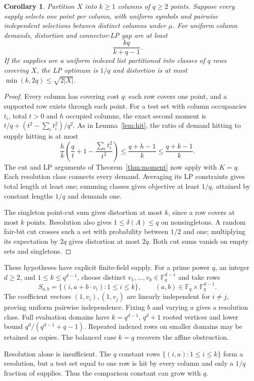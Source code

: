 \documentclass[11pt]{article}
\newtheorem{corollary}[theorem]{Corollary}
\newcommand{\F}{\mathbb F}
\begin{document}
\begin{corollary}\label{cor:transversal}
Partition $X$ into $k\ge1$ columns of $q\ge2$ points. Suppose every supply
selects one point per column, with uniform symbols and pairwise independent
selections between distinct columns under $\mu$. For uniform column demands,
distortion and connector-LP gap are at least
\[
 \frac{kq}{k+q-1}.
\]
If the supplies are a uniform indexed list partitioned into classes of $q$
rows covering $X$, the LP optimum is $1/q$ and distortion is at most
$\min(k,2q)\le\sqrt{2|X|}$.
\end{corollary}
\begin{proof}
Every column has covering cost $q$: each row covers one point, and a supported
row exists through each point. For a test set with column occupancies $t_i$,
total $t>0$ and $h$ occupied columns, the exact second moment is
$t/q+(t^2-\sum_i t_i^2)/q^2$. As in Lemma~\ref{lem:hit}, the ratio of demand
hitting to supply hitting is at most
\[
 \frac hk\left(\frac qt+1-\frac{\sum_i t_i^2}{t^2}\right)
 \le\frac{q+h-1}{k}\le\frac{q+k-1}{k}.
\]
The cut and LP arguments of Theorem~\ref{thm:moment} now apply with $K=q$.
Each resolution class connects every demand. Averaging its LP constraints
gives total length at least one; summing classes gives objective at least
$1/q$, attained by constant lengths $1/q$ and demands one.

The singleton point-cut sum gives distortion at most $k$, since a row
covers at most $k$ points. Resolution also gives $1\le\delta(A)\le q$ on
nonsingletons. A random fair-bit cut crosses such a set with probability
between $1/2$ and one; multiplying its expectation by $2q$ gives distortion
at most $2q$. Both cut sums vanish on empty sets and singletons.
\end{proof}

These hypotheses have explicit finite-field supply. For a prime power $q$,
an integer $d\ge2$, and $1\le k\le q^{d-1}$, choose distinct
$v_1,\ldots,v_k\in\F_q^{d-1}$ and take rows
\[
 S_{a,b}=\{(i,a+b\cdot v_i):1\le i\le k\},
 \qquad (a,b)\in\F_q\times\F_q^{d-1}.
\]
The coefficient vectors $(1,v_i),(1,v_j)$ are linearly independent for
$i\ne j$, proving uniform pairwise independence. Fixing $b$ and varying
$a$ gives a resolution class. Full evaluation domains have $k=q^{d-1}$,
$q^d+1$ rooted vertices and lower bound $q^d/(q^{d-1}+q-1)$.
Repeated indexed rows on smaller domains may be retained as copies.
The balanced case $k=q$ recovers the affine obstruction.

Resolution alone is insufficient. The $q$ constant rows
$\{(i,a):1\le i\le k\}$ form a resolution, but a test set equal to one
row is hit by every column and only a $1/q$ fraction of supplies.
Thus the comparison constant can grow with $q$.
\end{document}
